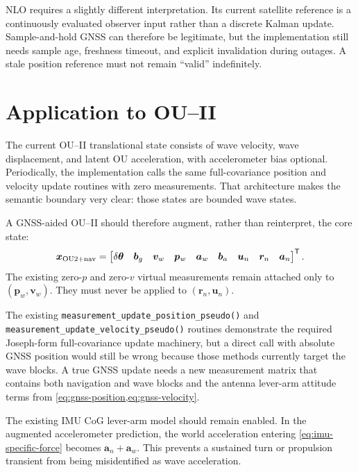 \documentclass[conference]{IEEEtran}
\DeclareRobustCommand{\vct}[1]{\bm{#1}}
\newcommand{\T}{^{\mathsf T}}
\begin{document}
NLO requires a slightly different interpretation.  Its current satellite reference
is a continuously evaluated observer input rather than a discrete Kalman update.
Sample-and-hold GNSS can therefore be legitimate, but the implementation still needs
sample age, freshness timeout, and explicit invalidation during outages.  A stale
position reference must not remain ``valid'' indefinitely.

\section{Application to OU--II}
\label{sec:ou2}

The current OU--II translational state consists of wave velocity, wave displacement,
and latent OU acceleration, with accelerometer bias optional.  Periodically, the
implementation calls the same full-covariance position and velocity update routines
with zero measurements.  That architecture makes the semantic boundary very clear:
those states are bounded wave states.

A GNSS-aided OU--II should therefore augment, rather than reinterpret, the core state:
\begin{equation}
\vct x_{\rm OU2+nav}=
\begin{bmatrix}
\delta\vct\theta & \vct b_g &
\vct v_w & \vct p_w & \vct a_w & \vct b_a &
\vct u_n & \vct r_n & \vct a_n
\end{bmatrix}\T.
\label{eq:ou2-augmented}
\end{equation}
The existing zero-$p$ and zero-$v$ virtual measurements remain attached only to
$(\vct p_w,\vct v_w)$.  They must never be applied to $(\vct r_n,\vct u_n)$.

The existing
\texttt{measurement\_update\_position\_pseudo()} and
\texttt{measurement\_update\_velocity\_pseudo()} routines demonstrate the required
Joseph-form full-covariance update machinery, but a direct call with absolute GNSS
position would still be wrong because those methods currently target the wave blocks.
A true GNSS update needs a new measurement matrix that contains both navigation and
wave blocks and the antenna lever-arm attitude terms from
\cref{eq:gnss-position,eq:gnss-velocity}.

The existing IMU CoG lever-arm model should remain enabled.  In the augmented
accelerometer prediction, the world acceleration entering
\cref{eq:imu-specific-force} becomes $\vct a_n+\vct a_w$.  This prevents a sustained
turn or propulsion transient from being misidentified as wave acceleration.
\end{document}
